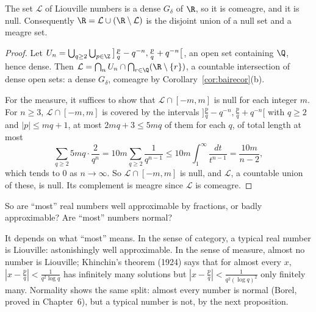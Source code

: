 \begin{theorem}\label{thm:liouville}
The set $\mathcal L$ of Liouville numbers is a dense $G_\delta$ of $\R$, so it is comeagre, and it is null. Consequently $\R=\mathcal L\cup(\R\setminus\mathcal L)$ is the
disjoint union of a null set and a meagre set.
\end{theorem}
\begin{proof}
Let $U_n=\bigcup_{q\ge2}\bigcup_{p\in\Z}\,\bigl]\frac pq-q^{-n},\frac pq+q^{-n}\bigr[$, an open set containing $\Q$, hence dense. Then $\mathcal L=\bigcap_nU_n\cap\bigcap_{r\in\Q}(\R\setminus\{r\})$, a countable
intersection of dense open sets: a dense $G_\delta$, comeagre by Corollary~\ref{cor:bairecor}(b).

For the measure, it suffices to show that $\mathcal L\cap[-m,m]$ is null for each integer $m$. For $n\ge3$, $\mathcal L\cap[-m,m]$ is covered by the intervals $]\frac pq-q^{-n},\frac pq+q^{-n}[$ with $q\ge2$
and $|p|\le mq+1$, at most $2mq+3\le5mq$ of them for each $q$, of total length at most
\[\sum_{q\ge2}5mq\cdot\frac2{q^n}=10m\sum_{q\ge2}\frac1{q^{n-1}}\le10m\int_1^\infty\frac{dt}{t^{n-1}}=\frac{10m}{n-2},\]
which tends to $0$ as $n\to\infty$. So $\mathcal L\cap[-m,m]$ is null, and $\mathcal L$, a countable union of these, is null. Its complement is meagre since $\mathcal L$ is comeagre.
\end{proof}

\begin{think}
So are ``most'' real numbers well approximable by fractions, or badly approximable? Are ``most'' numbers normal?
\end{think}

It depends on what ``most'' means. In the sense of category, a typical real number is Liouville: astonishingly well approximable.
In the sense of measure, almost no number is Liouville; Khinchin's theorem (1924) says that for almost every $x$, $|x-\frac pq|<\frac1{q^2\log q}$ has infinitely
many solutions but $|x-\frac pq|<\frac1{q^2(\log q)^2}$ only finitely many. Normality shows the same split: almost every number is normal (Borel, proved in
Chapter~6), but a typical number is not, by the next proposition.


